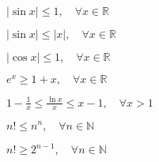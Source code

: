 



\everymath{\displaystyle}
\pagestyle{vangelis}



\setcounter{chapter}{1}

\begin{center}
  \minibox{\Large\bfseries \textcolor{Col1}{Απειροστικός Ι}}
\end{center}

\vspace{2\baselineskip}

\begin{minipage}[t]{0.45\textwidth}
  \minibox{\bfseries \large \textcolor{Col2}{Χρήσιμες Ανισότητες}}

  \begin{myitemize}
    \item $|\sin x|\leq 1, \quad \forall x\in \mathbb{R}$
    \item $|\sin x|\leq |x|, \quad \forall x\in \mathbb{R}$
    \item $|\cos x|\leq 1, \quad \forall x\in \mathbb{R}$
    \item $e^x\geq 1+x, \quad \forall x\in \mathbb{R}$
    \item $1-\frac{1}{x}\leq \frac{\ln x}{x}\leq x-1, \quad \forall x>1$
    \item $n!\leq n^n, \quad \forall n\in \mathbb{N}$
    \item $n!\geq 2^{n-1}, \quad \forall n\in \mathbb{N}$
  \end{myitemize}
  \end{minipage}\hfill\begin{minipage}[t]{0.45\textwidth}

  \minibox{\bfseries \large \textcolor{Col2}{Χρήσιμα Όρια Ακολουθιών}}


\end{minipage}
